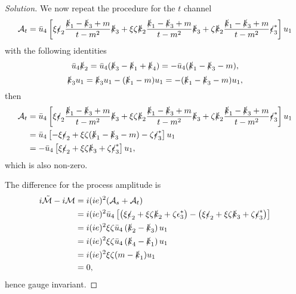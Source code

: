 \begin{proof}[Solution]
   We now repeat the procedure for the \(t\) channel
   \begin{equation*}
      \mathcal{A}_t = \bar{u}_4\left[\xi\slashed{\epsilon}_2 \frac{\slashed{k}_1 - \slashed{k}_3 + m}{t - m^2} \slashed{k}_3 + \xi \zeta \slashed{k}_2 \frac{\slashed{k}_1 - \slashed{k}_3 + m}{t - m^2} \slashed{k}_3 + \zeta \slashed{k}_2 \frac{\slashed{k}_1 - \slashed{k}_3 + m}{t - m^2} \slashed{\epsilon}^*_3 \right]u_1
   \end{equation*}
   with the following identities
   \begin{equation*}
       \bar{u}_4 \slashed{k}_2 = \bar{u}_4 (\slashed{k}_3 - \slashed{k}_1 + \slashed{k}_4) = - \bar{u}_4(\slashed{k}_1 - \slashed{k}_3 - m),
   \end{equation*}
   \begin{equation*}
       \slashed{k}_3 u_1 = \slashed{k}_3u_1 - (\slashed{k}_1 - m)u_1 = -(\slashed{k}_1 - \slashed{k}_3 - m)u_1,
   \end{equation*}
   then
   \begin{align*}
      \mathcal{A}_t &= \bar{u}_4\left[\xi\slashed{\epsilon}_2 \frac{\slashed{k}_1 - \slashed{k}_3 + m}{t - m^2} \slashed{k}_3 + \xi \zeta \slashed{k}_2 \frac{\slashed{k}_1 - \slashed{k}_3 + m}{t - m^2} \slashed{k}_3 + \zeta \slashed{k}_2 \frac{\slashed{k}_1 - \slashed{k}_3 + m}{t - m^2} \slashed{\epsilon}^*_3 \right]u_1\\
                    &= \bar{u}_4\left[-\xi \slashed{\epsilon}_2 + \xi \zeta (\slashed{k}_1 - \slashed{k}_3 - m) - \zeta \slashed{\epsilon}_3^*\right]u_1\\
                    &= -\bar{u}_4\left[\xi \slashed{\epsilon}_2 + \xi \zeta \slashed{k}_3 + \zeta \slashed{\epsilon}_3^*\right]u_1,
   \end{align*}
   which is also non-zero.

   The difference for the process amplitude is
   \begin{align*}
      i \tilde{\mathcal{M}} - i \mathcal{M} &= i (ie)^2 (\mathcal{A}_s + \mathcal{A}_t)\\
                                            &= i(ie)^2 \bar{u}_4 \left[\left(\xi \slashed{\epsilon}_2 + \xi \zeta \slashed{k}_2 + \zeta \epsilon_3^*\right) - \left(\xi \slashed{\epsilon}_2 + \xi \zeta \slashed{k}_3 + \zeta \slashed{\epsilon}_3^*\right)\right]\\
                                            &= i(i e)^2 \xi \zeta \bar{u}_4\left(\slashed{k}_2 - \slashed{k}_3\right) u_1\\
                                            &= i(ie)^2 \xi \zeta \bar{u}_4 \left(\slashed{k}_4 - \slashed{k}_1\right) u_1\\
                                            &= i(ie)^2 \xi \zeta (m - \slashed{k}_1) u_1\\
                                            &= 0,
   \end{align*}
   hence gauge invariant.
\end{proof}
